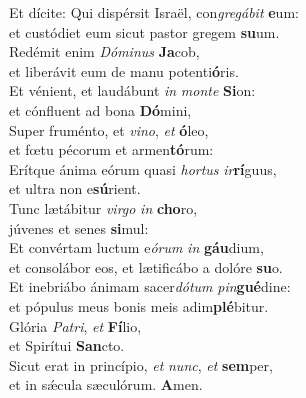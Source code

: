 \evenverse Et dícite: Qui dispérsit Israël, con\textit{gre}\textit{gá}\textit{bit} \textbf{e}um:~\*\\
\evenverse et custódiet eum sicut pastor gregem \textbf{su}um.\\
\oddverse Redémit enim \textit{Dó}\textit{mi}\textit{nus} \textbf{Ja}cob,~\*\\
\oddverse et liberávit eum de manu potenti\textbf{ó}ris.\\
\evenverse Et vénient, et laudábunt \textit{in} \textit{mon}\textit{te} \textbf{Si}on:~\*\\
\evenverse et cónfluent ad bona \textbf{Dó}mini,\\
\oddverse Super fruménto, et \textit{vi}\textit{no}, \textit{et} \textbf{ó}leo,~\*\\
\oddverse et fœtu pécorum et armen\textbf{tó}rum:\\
\evenverse Erítque ánima eórum quasi \textit{hor}\textit{tus} \textit{ir}\textbf{rí}guus,~\*\\
\evenverse et ultra non e\textbf{sú}rient.\\
\oddverse Tunc lætábitur \textit{vir}\textit{go} \textit{in} \textbf{cho}ro,~\*\\
\oddverse júvenes et senes \textbf{si}mul:\\
\evenverse Et convértam luctum e\textit{ó}\textit{rum} \textit{in} \textbf{gáu}dium,~\*\\
\evenverse et consolábor eos, et lætificábo a dolóre \textbf{su}o.\\
\oddverse Et inebriábo ánimam sacer\textit{dó}\textit{tum} \textit{pin}\textbf{gué}dine:~\*\\
\oddverse et pópulus meus bonis meis adim\textbf{plé}bitur.\\
\evenverse Glória \textit{Pa}\textit{tri}, \textit{et} \textbf{Fí}lio,~\*\\
\evenverse et Spirítui \textbf{San}cto.\\
\oddverse Sicut erat in princípio, \textit{et} \textit{nunc}, \textit{et} \textbf{sem}per,~\*\\
\oddverse et in sǽcula sæculórum. \textbf{A}men.\\
